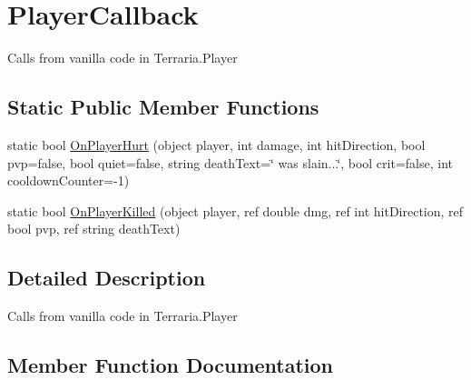 \hypertarget{classOTA_1_1Callbacks_1_1PlayerCallback}{}\section{Player\+Callback}
\label{classOTA_1_1Callbacks_1_1PlayerCallback}


Calls from vanilla code in Terraria.\+Player  


\subsection*{Static Public Member Functions}
\begin{DoxyCompactItemize}
\item 
static bool \hyperlink{classOTA_1_1Callbacks_1_1PlayerCallback_a0b9d3ba051d91ac5ea3ec67390e150ae}{On\+Player\+Hurt} (object player, int damage, int hit\+Direction, bool pvp=false, bool quiet=false, string death\+Text=\char`\"{} was slain...\char`\"{}, bool crit=false, int cooldown\+Counter=-\/1)
\item 
static bool \hyperlink{classOTA_1_1Callbacks_1_1PlayerCallback_a82711999589c370ae89fde9481fc53f0}{On\+Player\+Killed} (object player, ref double dmg, ref int hit\+Direction, ref bool pvp, ref string death\+Text)
\end{DoxyCompactItemize}


\subsection{Detailed Description}
Calls from vanilla code in Terraria.\+Player 



\subsection{Member Function Documentation}
\hypertarget{classOTA_1_1Callbacks_1_1PlayerCallback_a0b9d3ba051d91ac5ea3ec67390e150ae}{}
